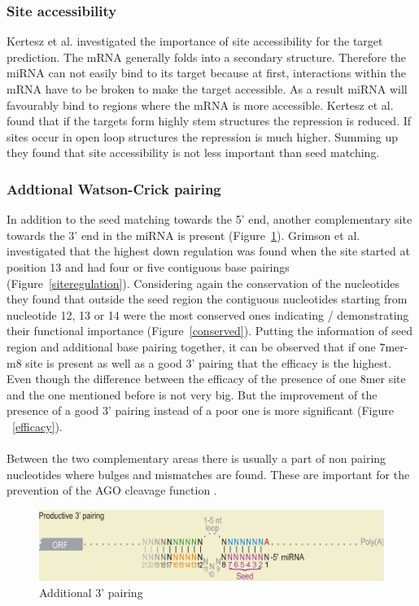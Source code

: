 \documentclass[12pt]{article}
\begin{document}
\subsubsection{Site accessibility}
Kertesz et al. \cite{Kertesz} investigated the importance of site accessibility for the target prediction. The mRNA generally folds into a secondary structure. Therefore the miRNA can not easily bind to its target because at first, interactions within the mRNA have to be broken to make the target accessible. As a result miRNA will favourably bind to regions where the mRNA is more accessible. Kertesz et al. \cite{Kertesz} found that if the targets form highly stem structures the repression is reduced. If sites occur in open loop structures the repression is much higher. Summing up they found that site accessibility is not less important than seed matching. \\


\subsubsection{Addtional Watson-Crick pairing}
In addition to the seed matching towards the 5' end, another complementary site towards the 3' end in the miRNA is present (Figure~\ref{addipairing}). Grimson et al. \cite{Grimson} investigated that the highest down regulation was found when the site started at position 13 and had four or five contiguous base pairings (Figure~\ref{siteregulation}). Considering again the conservation of the nucleotides they found that outside the seed region the contiguous nucleotides starting from nucleotide 12, 13 or 14 were the most conserved ones indicating / demonstrating their functional importance (Figure~\ref{conserved}). Putting the information of seed region and additional base pairing together, it can be observed that if one 7mer-m8 site is present as well as a good 3' pairing that the efficacy is the highest. Even though the difference between the efficacy of the presence of one 8mer site and the one mentioned before is not very big. But the improvement of the presence of a good 3' pairing instead of a poor one is more significant (Figure ~\ref{efficacy}).  \\\\
Between the two complementary areas there is usually a part of non pairing nucleotides where bulges and mismatches are found. These are important for the prevention of the AGO cleavage function \cite{Filipowicz}.

\begin{figure}[h]
\centering
\includegraphics[scale=0.3]{results/additional_pairing.PNG}
\caption{Additional 3' pairing}
\label{addipairing}
\end{figure}
\end{document}
